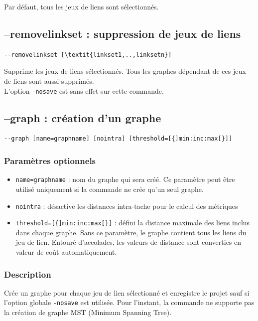 \documentclass[a4paper,10pt]{report}
\begin{document}
Par défaut, tous les jeux de liens sont sélectionnés.

\subsection{--removelinkset : suppression de jeux de liens}
\begin{Verbatim}[commandchars=\\\{\}]
--removelinkset [\textit{linkset1,..,linksetn}]
\end{Verbatim}
Supprime les jeux de liens sélectionnés. Tous les graphes dépendant de ces jeux de liens sont aussi supprimés.\\
L'option \verb|-nosave| est sans effet sur cette commande.


\subsection{--graph : création d'un graphe}
\begin{Verbatim}
--graph [name=graphname] [nointra] [threshold=[{]min:inc:max[}]]
\end{Verbatim}

\subsubsection{Paramètres optionnels}
\begin{itemize}
	\item \verb|name=graphname| : nom du graphe qui sera créé. Ce paramètre peut être utilisé uniquement si la commande ne crée qu'un seul graphe.
	\item \verb|nointra| : désactive les distances intra-tache pour le calcul des métriques
	\item \verb|threshold=[{]min:inc:max[}]| : défini la distance maximale des liens inclus dans chaque graphe. Sans ce paramètre, le graphe contient tous les liens du jeu de lien. Entouré d'accolades, les valeurs de distance sont converties en valeur de coût automatiquement.
\end{itemize}

\subsubsection{Description}
Crée un graphe pour chaque jeu de lien sélectionné et enregistre le projet sauf si l'option globale \verb|-nosave| est utilisée.
Pour l'instant, la commande ne supporte pas la création de graphe MST (Minimum Spanning Tree).
\end{document}
